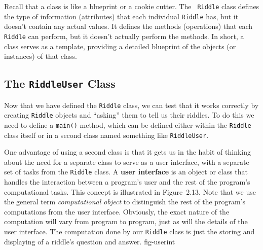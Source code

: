 Recall that a class is like a blueprint or a cookie cutter. The {\tt
Riddle} class defines the type of information (attributes) that each
individual {\tt Riddle} has, but it doesn't contain any actual values.
It defines the methods (operations) that each {\tt Riddle} can
perform, but it doesn't actually perform the methods.  In short, a
class serves as a template, providing a detailed blueprint of the
objects (or instances) of that class.

\subsection{The {\tt RiddleUser} Class}

\noindent Now that we have defined the {\tt Riddle} class, we can
test that it works correctly by creating {\tt Riddle} objects
and ``asking'' them to tell us their riddles.  To do this we need
to define a {\tt main()} method, which can be defined either within
the {\tt Riddle} class itself or in a second class named something
like {\tt RiddleUser}.  

One advantage of using a second class is that it gets us in the
habit of thinking about the need for a separate class to serve as a
user interface, with a separate set of tasks from the {\tt Riddle}
class. A {\bf user interface} is an object or class that handles the
interaction between a program's user and the rest of the program's
computational tasks. This concept is illustrated in Figure~2.13. Note
that we use the general term {\it computational object} to distinguish
the rest of the program's computations from the user interface.
Obviously, the exact nature of the computation will vary from program
to program, just as will the details of the user interface.  The
computation done by our {\tt Riddle} class is just the storing and
displaying of a riddle's question and answer.
{fig-userint}


